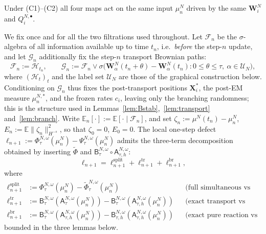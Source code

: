 \documentclass[a4paper,fleqn]{cas-sc}
\theoremstyle{definition}
\theoremstyle{remark}
\begin{document}
Under
(C1)--(C2) all four maps act on the same input $\mu^N_n$ driven by the same
$\mathbf W^N_i$ and $Q^{N,\bullet}_i$.

We fix once and for all the two filtrations used throughout. Let $\mathcal F_n$ be
the $\sigma$-algebra of all information available up to time $t_n$, i.e.\
\emph{before} the step-$n$ update, and let $\mathcal G_n$ additionally fix the
step-$n$ transport Brownian paths:
\begin{equation}\label{eq:filtrations}
\mathcal F_n:=\mathcal H_{t_n},
\qquad
\mathcal G_n:=\mathcal F_n\vee\sigma\bigl(\mathbf W^N_\alpha(t_n+\theta)-\mathbf W^N_\alpha(t_n):
0\le\theta\le\tau,\ \alpha\in\mathcal U_N\bigr),
\end{equation}
where $(\mathcal H_t)_t$ and the label set $\mathcal U_N$ are those of the graphical
construction below. Conditioning on $\mathcal G_n$ thus fixes the post-transport
positions $\mathbf X^*_i$, the post-EM measure $\mu^{N,*}_n$, and the frozen rates
$c_i$, leaving only the branching randomness; this is the structure used in
Lemmas~\ref{lem:Bstab},~\ref{lem:transport} and~\ref{lem:branch}. Write
$\mathbb E_n[\cdot]:=\mathbb E[\cdot\mid\mathcal F_n]$, and set
$\zeta_n:=\mu^N(t_n)-\mu^N_n$, $E_n:=\mathbb E\|\zeta_n\|_{H^{-s}}^2$, so that
$\zeta_0=0$, $E_0=0$. The local one-step defect
$\ell_{n+1}:=\Phi^{N,\omega}_\tau(\mu^N_n)-\Psi^{N,\omega}_\tau(\mu^N_n)$
admits the three-term decomposition obtained by inserting $\widetilde\Phi$ and
$\mathsf B^{N,\omega}_\tau\circ\mathsf A^{N,\omega}_{\tau,h}$:
\[
\ell_{n+1}=\ell^{\mathrm{split}}_{n+1}+\ell^{\mathrm{tr}}_{n+1}+\ell^{\mathrm{br}}_{n+1},
\]
where
\begin{align*}
\ell^{\mathrm{split}}_{n+1}
&:=\Phi^{N,\omega}_\tau(\mu^N_n)-\widetilde\Phi^{N,\omega}_\tau(\mu^N_n)
&&\text{(full simultaneous vs exact Lie split),}\\
\ell^{\mathrm{tr}}_{n+1}
&:=\mathsf B^{N,\omega}_\tau(\mathsf A^{N,\omega}_\tau(\mu^N_n))
   -\mathsf B^{N,\omega}_\tau(\mathsf A^{N,\omega}_{\tau,h}(\mu^N_n))
&&\text{(exact transport vs EM, then exact branching),}\\
\ell^{\mathrm{br}}_{n+1}
&:=\mathsf B^{N,\omega}_\tau(\mathsf A^{N,\omega}_{\tau,h}(\mu^N_n))
   -\mathsf B^{N,\omega}_{\tau,h}(\mathsf A^{N,\omega}_{\tau,h}(\mu^N_n))
&&\text{(exact pure reaction vs frozen-rate branching),}
\end{align*}
bounded in the three lemmas below.
\end{document}
